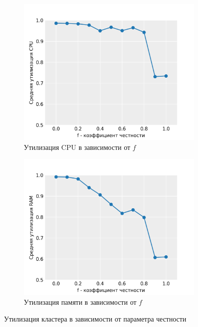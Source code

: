 \begin{figure}[h!]
    \centering 
    \begin{subfigure}{0.49\linewidth}
        \centering
        \includegraphics[width=\linewidth]{images/cpu_utilization}
        \caption{Утилизация CPU в зависимости от $f$}
    \end{subfigure}
    \begin{subfigure}{0.49\linewidth}
        \centering
        \includegraphics[width=\linewidth]{images/memory_utilization}
        \caption{Утилизация памяти в зависимости от $f$}
    \end{subfigure}
    \caption{Утилизация кластера в зависимости от параметра честности}
    \label{fig:utilization-results}
\end{figure}

